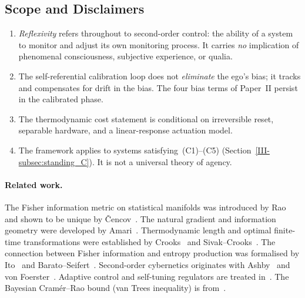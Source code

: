 \documentclass[12pt,a4paper,openany]{book}
\begin{document}
\subsection{Scope and Disclaimers}
\label{III-subsec:scope}

\begin{enumerate}
\item \emph{Reflexivity} refers throughout to
  second-order control: the ability of a system to
  monitor and adjust its own monitoring process.
  It carries \emph{no} implication of phenomenal
  consciousness, subjective experience, or qualia.
\item The self-referential calibration loop does not
  \emph{eliminate} the ego's bias; it tracks and
  compensates for drift in the bias.
  The four bias terms of Paper~II persist in the
  calibrated phase.
\item The thermodynamic cost statement is conditional on irreversible
  reset, separable hardware, and a linear-response actuation model.
\item The framework applies to systems
  satisfying~(C1)--(C5) (Section~\ref{III-subsec:standing_C}).
  It is not a universal theory of agency.
\end{enumerate}

\paragraph{Related work.}
The Fisher information metric on statistical manifolds was
introduced by Rao~\cite{Rao1945} and shown to be unique
by \v{C}encov~\cite{Cencov1982}.
The natural gradient and information geometry were developed
by Amari~\cite{Amari1998,AmariNagaoka2000}.
Thermodynamic length and optimal finite-time transformations
were established by
Crooks~\cite{Crooks2007} and
Sivak--Crooks~\cite{SivakCrooks2012}.
The connection between Fisher information and entropy
production was formalised by Ito~\cite{Ito2018} and
Barato--Seifert~\cite{BaratoSeifert2015}.
Second-order cybernetics originates with
Ashby~\cite{Ashby1956} and
von Foerster~\cite{vonFoerster2003}.
Adaptive control and self-tuning regulators are treated
in~\cite{AstromWittenmark1995}.
The Bayesian Cram\'{e}r--Rao bound (van Trees inequality)
is from~\cite{vanTrees1968}.
\end{document}
